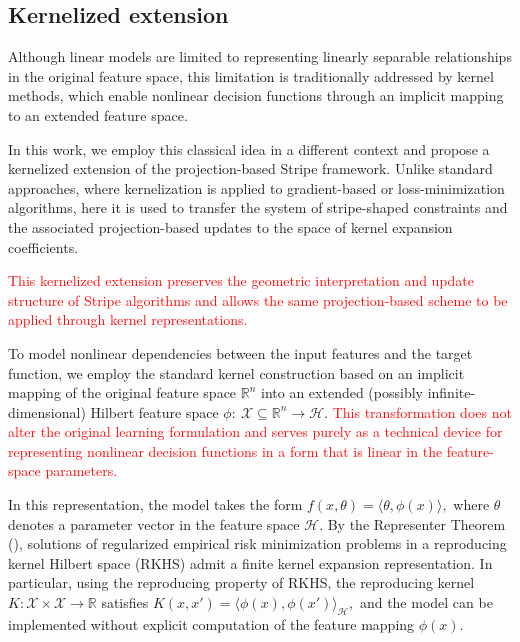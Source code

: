 \documentclass[a4paper,fleqn]{cas-sc}
\begin{document}
\subsection{Kernelized extension}

Although linear models are limited to representing linearly separable relationships
in the original feature space, this limitation is traditionally addressed by kernel methods,
which enable nonlinear decision functions through an implicit mapping to an extended feature space.

In this work, we employ this classical idea in a different context and propose a
kernelized extension of the projection-based Stripe framework.
Unlike standard approaches, where kernelization is applied to gradient-based
or loss-minimization algorithms, here it is used to transfer the system of stripe-shaped
constraints and the associated projection-based updates to the space of kernel expansion
coefficients.

\textcolor{red}{This kernelized extension preserves the geometric interpretation and update structure of Stripe algorithms and allows the same projection-based scheme to be applied through kernel representations.}


To model nonlinear dependencies between the input features and the target function,
we employ the standard kernel construction based on an implicit mapping of the original
feature space $\mathbb{R}^n$ into an extended (possibly infinite-dimensional)
Hilbert feature space
$
\phi:\ \mathcal{X}\subseteq\mathbb{R}^n \to \mathcal{H}.
$
\textcolor{red}{This transformation does not alter the original learning formulation and serves purely as a technical device for representing nonlinear decision functions in a form that is linear in the feature-space parameters.}

In this representation, the model takes the form
$
f(x,\theta)=\langle \theta,\phi(x)\rangle,
$
where $\theta$ denotes a parameter vector in the feature space $\mathcal{H}$.
By the Representer Theorem (\cite{Scholkopf2002,Hofmann2008}), solutions of regularized empirical risk minimization problems in a reproducing kernel Hilbert space (RKHS) admit a finite kernel expansion representation. In particular, using the reproducing property of RKHS, the reproducing kernel $K:\mathcal{X}\times\mathcal{X}\to\mathbb{R}$ satisfies
$
K(x,x')=\langle \phi(x),\phi(x')\rangle_{\mathcal H},
$
and the model can be implemented without explicit computation of the feature mapping $\phi(x)$.
\end{document}
